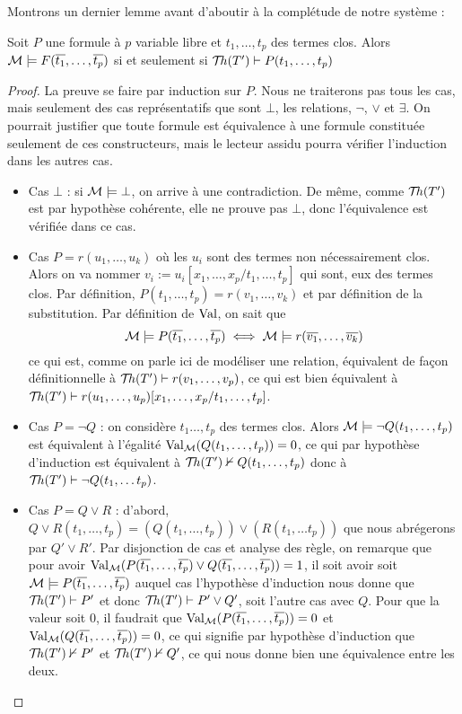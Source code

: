 Montrons un dernier lemme avant d'aboutir à la complétude de notre système :

\begin{lem}
    Soit $P$ une formule à $p$ variable libre et $t_1,\ldots, t_p$ des termes clos. Alors $\mathcal M\models F(\overline{t_1},\ldots,\overline{t_p})$ si et seulement si $\mathcal{T}\!h(T')\vdash P(t_1,\ldots,t_p)$
\end{lem}

\begin{proof}
    La preuve se faire par induction sur $P$. Nous ne traiterons pas tous les cas, mais seulement des cas représentatifs que sont $\bot$, les relations, $\lnot$, $\lor$ et $\exists$. On pourrait justifier que toute formule est équivalence à une formule constituée seulement de ces constructeurs, mais le lecteur assidu pourra vérifier l'induction dans les autres cas.
    \begin{itemize}[label=$\bullet$]
        \item Cas $\bot$ : si $\mathcal M\models \bot$, on arrive à une contradiction. De même, comme $\mathcal{T}\!h(T')$ est par hypothèse cohérente, elle ne prouve pas $\bot$, donc l'équivalence est vérifiée dans ce cas.
        \item Cas $P=r(u_1,\ldots,u_k)$ où les $u_i$ sont des termes non nécessairement clos. Alors on va nommer $v_i := u_i[x_1,\ldots,x_p/t_1,\ldots,t_p]$ qui sont, eux des termes clos. Par définition, $P(t_1,\ldots,t_p) = r(v_1,\ldots,v_k)$ et par définition de la substitution. Par définition de $\mathrm{Val}$, on sait que $$\mathcal M\models P(\overline{t_1},\ldots,\overline{t_p}) \iff \mathcal M\models r(\overline{v_1},\ldots,\overline{v_k})$$ ce qui est, comme on parle ici de modéliser une relation, équivalent de façon définitionnelle à $\mathcal{T}\!h(T')\vdash r(v_1,\ldots,v_p)$, ce qui est bien équivalent à $\mathcal{T}\!h(T')\vdash r(u_1,\ldots,u_p)[x_1,\ldots,x_p/t_1,\ldots,t_p]$.
        \item Cas $P = \lnot Q$ : on considère $t_1\ldots,t_p$ des termes clos. Alors $\mathcal M\models \lnot Q(t_1,\ldots,t_p)$ est équivalent à l'égalité $\mathrm{Val}_{\mathcal M}(Q(t_1,\ldots,t_p))=0$, ce qui par hypothèse d'induction est équivalent à $\mathcal{T}\!h(T')\nvdash Q(t_1,\ldots,t_p)$ donc à $\mathcal{T}\!h(T')\vdash \lnot Q(t_1,\ldots t_p)$.
        \item Cas $P = Q\lor R$ : d'abord, $Q\lor R (t_1,\ldots,t_p) = (Q(t_1,\ldots,t_p))\lor (R(t_1,\ldots t_p))$ que nous abrégerons par $Q'\lor R'$. Par disjonction de cas et analyse des règle, on remarque que pour avoir $\mathrm{Val}_{\mathcal M}(P(\overline{t_1},\ldots,\overline{t_p})\lor Q(\overline{t_1},\ldots,\overline{t_p}))=1$, il soit avoir soit $\mathcal M\models P(\overline{t_1},\ldots,\overline{t_p})$ auquel cas l'hypothèse d'induction nous donne que $\mathcal{T}\!h(T')\vdash P'$ et donc $\mathcal{T}\!h(T')\vdash P'\lor Q'$, soit l'autre cas avec $Q$. Pour que la valeur soit $0$, il faudrait que $\mathrm{Val}_{\mathcal M}(P(\overline{t_1},\ldots,\overline{t_p}))=0$ et $\mathrm{Val}_{\mathcal M}(Q(\overline{t_1},\ldots,\overline{t_p}))=0$, ce qui signifie par hypothèse d'induction que $\mathcal{T}\!h(T')\nvdash P'$ et $\mathcal{T}\!h(T')\nvdash Q'$, ce qui nous donne bien une équivalence entre les deux.

\end{itemize}
\end{proof}
